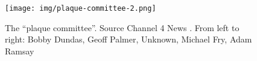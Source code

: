 \documentclass{scrartcl}
\begin{document}
\begin{appendices}
\begin{figure}
    \centering
    \texttt{[image: img/plaque-committee-2.png]}
    \caption{The ``plaque committee''. Source Channel 4 News 
    \cite{c4n_2018}. From left to right: Bobby Dundas, Geoff Palmer, Unknown, Michael Fry, Adam Ramsay}
    \label{fig:plaque-committee}
\end{figure}
\end{appendices}
\end{document}

